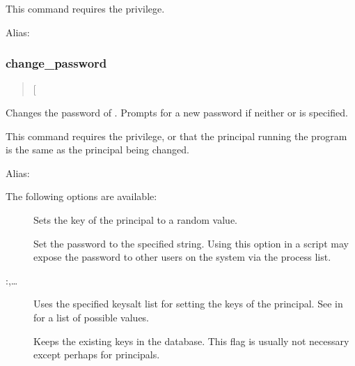 \documentclass[letterpaper,10pt,english]{sphinxmanual}
\begin{document}
This command requires the  privilege.

Alias: 


\subsubsection{change\_password}
\label{\detokenize{admin/admin_commands/kadmin_local:id5}}\label{\detokenize{admin/admin_commands/kadmin_local:change-password}}\begin{quote}

 {[}\sphinxstyleemphasis{options}{]} 
\end{quote}

Changes the password of .  Prompts for a new password if
neither  or  is specified.

This command requires the  privilege, or that the
principal running the program is the same as the principal being
changed.

Alias: 

The following options are available:
\begin{description}
\item[{}] \leavevmode
Sets the key of the principal to a random value.

\item[{ }] \leavevmode
Set the password to the specified string.  Using this option in a
script may expose the password to other users on the system via
the process list.

\item[{ :,…}] \leavevmode
Uses the specified keysalt list for setting the keys of the
principal.  See {\hyperref[\detokenize{admin/conf_files/kdc_conf:keysalt-lists}]{}} in {\hyperref[\detokenize{admin/conf_files/kdc_conf:kdc-conf-5}]{}} for a
list of possible values.

\item[{}] \leavevmode
Keeps the existing keys in the database.  This flag is usually not
necessary except perhaps for  principals.

\end{description}
\end{document}
